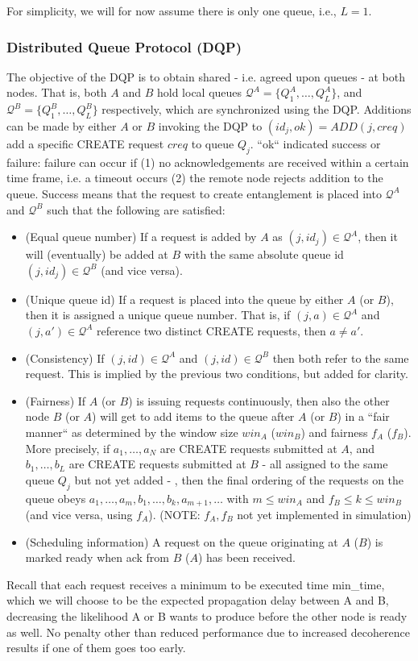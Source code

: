 \documentclass{article}
\begin{document}
For simplicity, we will for now assume there is only one queue, i.e., $L=1$.

\subsubsection{Distributed Queue Protocol (DQP)}
The objective of the DQP is to obtain shared - i.e. agreed upon queues - at both nodes. That is, both $A$ and $B$ hold local queues 
$\mathcal{Q}^A = \{Q_1^A,\ldots,Q_L^A\}$, and $\mathcal{Q}^B = \{Q_1^B,\ldots,Q_L^B\}$ respectively, which are 
synchronized using the DQP. Additions can be made by either $A$ or $B$ invoking the DQP to $(id_j, ok) = ADD(j, creq)$ add a specific CREATE request $creq$ to queue
$Q_j$. ``ok`` indicated success or failure: failure can occur if (1) no acknowledgements are received within a certain time frame, i.e. a timeout occurs
(2) the remote node rejects addition to the queue. Success means that the request 
to create entanglement is placed into $\mathcal{Q}^A$ and $\mathcal{Q}^B$ such that the following are satisfied:
\begin{itemize}
\item (Equal queue number) If a request is added by $A$ as $(j,id_j) \in \mathcal{Q}^A$, then it will (eventually) be added at $B$ with the same absolute queue id 
$(j,id_j) \in \mathcal{Q}^B$ (and vice versa).
\item (Unique queue id) If a request is placed into the queue by either $A$ (or $B$), 
then it is assigned a unique queue number. That is, 
if $(j,a) \in \mathcal{Q}^A$ and $(j,a') \in \mathcal{Q}^A$ reference two distinct CREATE requests, then $a \neq a'$.
\item (Consistency) If $(j,id) \in \mathcal{Q}^A$ and $(j,id) \in \mathcal{Q}^B$ then both refer to the same request. This is implied by the previous two 
conditions, but added for clarity.
\item (Fairness) If $A$ (or $B$) is issuing requests continuously, then also the other node $B$ (or $A$) will get to add items to the queue after $A$ (or $B$)
in a ``fair manner`` as determined by the window size $win_A$ ($win_B$) and fairness $f_A$ ($f_B$).  
More precisely, if $a_1,\ldots,a_N$ are CREATE requests submitted at $A$, and $b_1,\ldots,b_L$ are CREATE requests submitted
at $B$ - all assigned to the same queue $Q_j$ but not yet added - , then the final ordering of the requests on the queue obeys 
$a_1,\ldots,a_m,b_1,\ldots,b_k,a_{m+1},\ldots$ with $m \leq win_A$ and $f_B \leq k \leq win_B$ (and vice versa, using $f_A$). (NOTE: $f_A,f_B$ not yet implemented in simulation)
\item (Scheduling information) A request on the queue originating at $A$ ($B$) is marked ready when ack from $B$ ($A$) has been received.
\end{itemize}
Recall that each request receives a minimum to be executed time min\_time, which we will choose to be the expected propagation delay between A and B, decreasing the likelihood A or B wants to produce before the other node is ready as well. No penalty other than reduced performance due to increased decoherence results if one of them goes too early.
\end{document}
